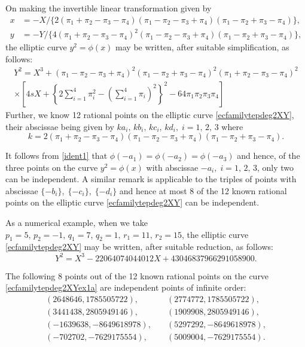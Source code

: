 \documentclass[11pt, leqno]{article}
\begin{document}
On making the invertible linear transformation given by
\begin{equation}
\begin{aligned}
x&=-X/\{2(\pi_1+\pi_2-\pi_3-\pi_4)(\pi_1-\pi_2-\pi_3+\pi_4)(\pi_1-\pi_2+\pi_3-\pi_4)\},\\
 y& = -Y/\{4(\pi_1+\pi_2-\pi_3-\pi_4)^2(\pi_1-\pi_2-\pi_3+\pi_4)(\pi_1-\pi_2+\pi_3-\pi_4)\},
\end{aligned}
\end{equation}
the elliptic curve $y^2=\phi(x)$ may be written, after suitable simplification, as follows: 
\begin{multline}
Y^2= X^3+(\pi_1-\pi_2-\pi_3+\pi_4)^2(\pi_1-\pi_2+\pi_3-\pi_4)^2(\pi_1+\pi_2-\pi_3-\pi_4)^2\\
\times \left[ 4sX+\left \{2\sum_{i=1}^4\pi_i^2-\left (\sum_{i=1}^4\pi_i \right)^2\right \}^2-64\pi_1\pi_2\pi_3\pi_4\right ]\quad \quad \quad \quad \label{ecfamilytepdeg2XY}
\end{multline}
Further, we know  12 rational points on the elliptic curve \eqref{ecfamilytepdeg2XY}, their    abscissae being  given by $ka_i,\, kb_i,\,kc_i,\,kd_i,\;i=1,\,2,\,3$ where 
\[k=2(\pi_1+\pi_2-\pi_3-\pi_4)(\pi_1-\pi_2-\pi_3+\pi_4)(\pi_1-\pi_2+\pi_3-\pi_4).\]

It follows from \eqref{ident1} that $\phi(-a_1)=\phi(-a_2)=\phi(-a_3)$ and hence, of the three points on the curve $y^2=\phi(x)$ with abscissae $-a_i,\;i=1,\,2,\,3$, only two can be independent. A similar remark is applicable to the triples of points with abscissae $\{-b_i\},\;\{-c_i\},\;\{-d_i\}$ and hence  at most  8 of the  12 known rational points on the elliptic curve \eqref{ecfamilytepdeg2XY} can be independent.

As a numerical example, when we take $p_1=5,\, p_2= -1,\, q_1=   7,\, q_2=   1,\, r_1=   11,\, r_2=   15$, the elliptic curve \eqref{ecfamilytepdeg2XY} may be written, after suitable reduction, as follows:
\begin{equation}
Y^2 = X^3-22064074044012X+43046837966291058900.
\label{ecfamilytepdeg2XYex1a}
\end{equation}

The following 8 points out of the 12 known rational points on the curve \eqref{ecfamilytepdeg2XYex1a} are independent points of infinite order:
\begin{equation}
\begin{aligned}
(2648646, 1785505722),\quad  & (2774772, 1785505722),\\
 (3441438, 2805949146),\quad &  (1909908, 2805949146), \\
	(-1639638, -8649618978),\quad  & (5297292, -8649618978), \\
  (-702702, -7629175554),\quad  &(5009004, -7629175554).
	\end{aligned} \label{ecfam2ex1points}
	\end{equation}
\end{document}
